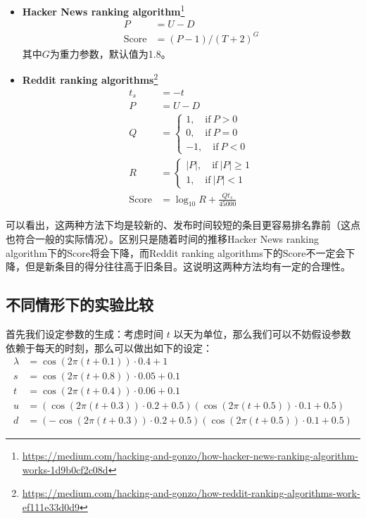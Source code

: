 \documentclass[UTF8]{ctexart}
\theoremstyle{plain}
\theoremstyle{definition}
\theoremstyle{remark}
\begin{document}
    \begin{itemize}
        \item \textbf{Hacker News ranking algorithm}\footnote{\url{https://medium.com/hacking-and-gonzo/how-hacker-news-ranking-algorithm-works-1d9b0cf2c08d}}
        \begin{equation}
        \begin{aligned}
        P & = U - D \\
	    \mathrm{Score} & = (P - 1)/(T + 2)^G
        \end{aligned}
	    \end{equation}
        其中$G$为重力参数，默认值为1.8。
        \item \textbf{Reddit ranking algorithms}\footnote{\url{https://medium.com/hacking-and-gonzo/how-reddit-ranking-algorithms-work-ef111e33d0d9}}
        \begin{equation}
        \begin{aligned}
        t_{s} & = -t \\
        P & = U - D \\
        Q & = \begin{cases}
                1, \quad \mathrm{if} \ P > 0 \\
                0, \quad \mathrm{if} \ P = 0 \\
                -1, \quad \mathrm{if} \ P < 0
            \end{cases} \\
        R & = \begin{cases}
            |P|, \quad \mathrm{if} \ |P| \geq 1 \\
            1, \quad \mathrm{if} \ |P| < 1
            \end{cases} \\
        \mathrm{Score} & =  \log_{10} R + \frac{Qt_s}{45000}
        \end{aligned}
	    \end{equation}
    \end{itemize}
    可以看出，这两种方法下均是较新的、发布时间较短的条目更容易排名靠前（这点也符合一般的实际情况）。区别只是随着时间的推移Hacker News ranking algorithm下的$\mathrm{Score}$将会下降，而Reddit ranking algorithms下的$\mathrm{Score}$不一定会下降，但是新条目的得分往往高于旧条目。这说明这两种方法均有一定的合理性。

	\subsection{不同情形下的实验比较}
	首先我们设定参数的生成：考虑时间 $t$ 以天为单位，那么我们可以不妨假设参数依赖于每天的时刻，那么可以做出如下的设定：
	\begin{align}
		\lambda &= \cos(2\pi(t+0.1)) \cdot 0.4 + 1 \\
		s &= \cos(2\pi(t+0.8)) \cdot 0.05 + 0.1 \\
		t &= \cos(2\pi(t+0.4))\cdot 0.06 + 0.1 \\
		u &= (\cos(2\pi(t+0.3)) \cdot 0.2 + 0.5)(\cos(2\pi(t+0.5))\cdot 0.1 + 0.5) \\
		d &= (-\cos(2\pi(t+0.3)) \cdot 0.2 + 0.5)(\cos(2\pi(t+0.5))\cdot 0.1 + 0.5)
	\end{align}
	
\end{document}
